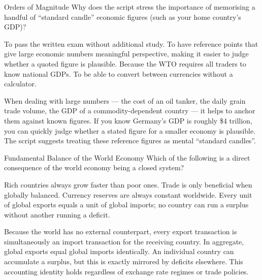 \documentclass[paper=a5]{scrartcl}
\begin{document}
\begin{question}[type=mc]{Orders of Magnitude}
Why does the script stress the importance of memorising a handful of
``standard candle'' economic figures (such as your home country's GDP)?
\begin{choices}
  \choice        To pass the written exam without additional study.
  \correctchoice To have reference points that give large economic numbers
                 meaningful perspective, making it easier to judge whether a
                 quoted figure is plausible.
  \choice        Because the WTO requires all traders to know national GDPs.
  \choice        To be able to convert between currencies without a calculator.
\end{choices}
\begin{solution}
  When dealing with large numbers --- the cost of an oil tanker, the daily
  grain trade volume, the GDP of a commodity-dependent country --- it helps to
  anchor them against known figures. If you know Germany's GDP is roughly
  \$4 trillion, you can quickly judge whether a stated figure for a smaller
  economy is plausible. The script suggests treating these reference figures
  as mental ``standard candles''.
\end{solution}
\end{question}

\begin{question}[type=mc]{Fundamental Balance of the World Economy}
Which of the following is a direct consequence of the world economy being
a closed system?
\begin{choices}
  \choice        Rich countries always grow faster than poor ones.
  \choice        Trade is only beneficial when globally balanced.
  \choice        Currency reserves are always constant worldwide.
  \correctchoice Every unit of global exports equals a unit of global imports;
                 no country can run a surplus without another running a deficit.
\end{choices}
\begin{solution}
  Because the world has no external counterpart, every export transaction is
  simultaneously an import transaction for the receiving country. In aggregate,
  global exports equal global imports identically. An individual country can
  accumulate a surplus, but this is exactly mirrored by deficits elsewhere.
  This accounting identity holds regardless of exchange rate regimes or trade
  policies.
\end{solution}
\end{question}
\end{document}
